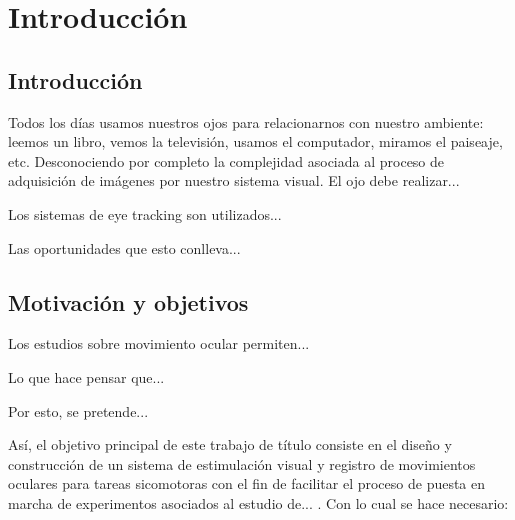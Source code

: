 \documentclass[../main.tex]{subfiles}
\begin{document}
		
\chapter{Introducción}
\label{cha:01_introducción}
	\section{Introducción}
	\label{sec:01_introducción}
		Todos los días usamos nuestros ojos para relacionarnos con nuestro ambiente: leemos un libro, vemos la televisión, usamos el computador, miramos el paiseaje, etc. Desconociendo por completo la complejidad asociada al proceso de adquisición de imágenes por nuestro sistema visual. El ojo debe realizar... 

		Los sistemas de eye tracking son utilizados...

		Las oportunidades que esto conlleva...


	\section{Motivación y objetivos}
	\label{sec:01_motivacón_y_objetivos}
		Los estudios sobre movimiento ocular permiten...

		Lo que hace pensar que...

		Por esto, se pretende...

		Así, el objetivo principal de este trabajo de título consiste en el diseño y construcción de un sistema de estimulación visual y registro de movimientos oculares para tareas sicomotoras con el fin de facilitar el proceso de puesta en marcha de experimentos asociados al estudio de... . Con lo cual se hace necesario:
\end{document}
